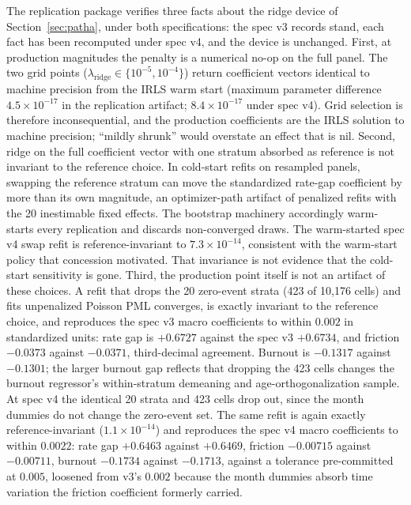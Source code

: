 \documentclass[12pt]{article}
\begin{document}
The replication package verifies three facts about the ridge device of Section~\ref{sec:patha}, under both specifications: the spec v3 records stand, each fact has been recomputed under spec v4, and the device is unchanged. First, at production magnitudes the penalty is a numerical no-op on the full panel. The two grid points ($\lambda_{\mathrm{ridge}} \in \{10^{-5}, 10^{-4}\}$) return coefficient vectors identical to machine precision from the IRLS warm start (maximum parameter difference $4.5\times10^{-17}$ in the replication artifact; $8.4\times10^{-17}$ under spec v4). Grid selection is therefore inconsequential, and the production coefficients are the IRLS solution to machine precision; ``mildly shrunk'' would overstate an effect that is nil. Second, ridge on the full coefficient vector with one stratum absorbed as reference is not invariant to the reference choice. In cold-start refits on resampled panels, swapping the reference stratum can move the standardized rate-gap coefficient by more than its own magnitude, an optimizer-path artifact of penalized refits with the 20 inestimable fixed effects. The bootstrap machinery accordingly warm-starts every replication and discards non-converged draws. The warm-started spec v4 swap refit is reference-invariant to $7.3\times10^{-14}$, consistent with the warm-start policy that concession motivated. That invariance is not evidence that the cold-start sensitivity is gone. Third, the production point itself is not an artifact of these choices. A refit that drops the 20 zero-event strata (423 of 10,176 cells) and fits unpenalized Poisson PML converges, is exactly invariant to the reference choice, and reproduces the spec v3 macro coefficients to within $0.002$ in standardized units: rate gap is $+0.6727$ against the spec v3 $+0.6734$, and friction $-0.0373$ against $-0.0371$, third-decimal agreement. Burnout is $-0.1317$ against $-0.1301$; the larger burnout gap reflects that dropping the 423 cells changes the burnout regressor's within-stratum demeaning and age-orthogonalization sample. At spec v4 the identical 20 strata and 423 cells drop out, since the month dummies do not change the zero-event set. The same refit is again exactly reference-invariant ($1.1\times10^{-14}$) and reproduces the spec v4 macro coefficients to within $0.0022$: rate gap $+0.6463$ against $+0.6469$, friction $-0.00715$ against $-0.00711$, burnout $-0.1734$ against $-0.1713$, against a tolerance pre-committed at $0.005$, loosened from v3's $0.002$ because the month dummies absorb time variation the friction coefficient formerly carried.
\end{document}
